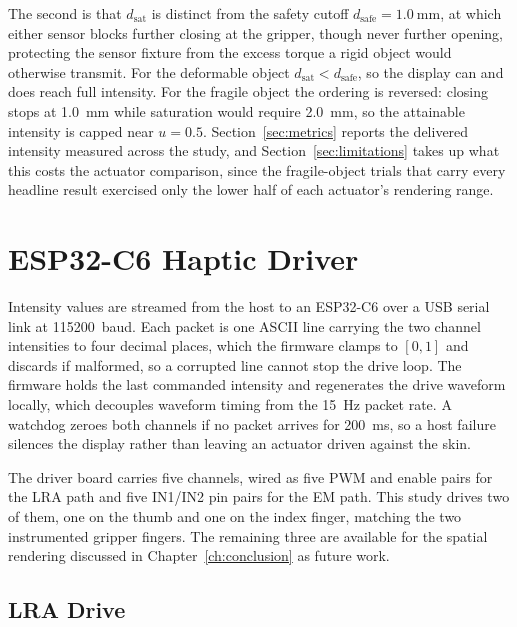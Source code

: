\documentclass[12pt, a4paper, twoside, openright]{report}
\begin{document}
The second is that $d_{\text{sat}}$ is distinct from the safety cutoff
$d_{\text{safe}} = \SI{1.0}{\milli\metre}$, at which either sensor blocks
further closing at the gripper, though never further opening, protecting the
sensor fixture from the excess torque a rigid object would otherwise transmit.
For the deformable object $d_{\text{sat}} < d_{\text{safe}}$, so the display
can and does reach full intensity. For the fragile object the ordering is
reversed: closing stops at \SI{1.0}{\milli\metre} while saturation would
require \SI{2.0}{\milli\metre}, so the attainable intensity is capped near
$u = 0.5$. Section~\ref{sec:metrics} reports the delivered intensity measured
across the study, and Section~\ref{sec:limitations} takes up what this costs
the actuator comparison, since the fragile-object trials that carry every
headline result exercised only the lower half of each actuator's rendering
range.

\section{ESP32-C6 Haptic Driver}
\label{sec:driver}

Intensity values are streamed from the host to an ESP32-C6 over a USB serial
link at \SI{115200}{baud}. Each packet is one ASCII line carrying the two
channel intensities to four decimal places, which the firmware clamps to
$[0,1]$ and discards if malformed, so a corrupted line cannot stop the drive
loop. The firmware holds the last commanded intensity and regenerates the drive
waveform locally, which decouples waveform timing from the
\SI{15}{\hertz} packet rate. A watchdog zeroes both channels if no packet
arrives for \SI{200}{\milli\second}, so a host failure silences the display
rather than leaving an actuator driven against the skin.

The driver board carries five channels, wired as five PWM and enable pairs for
the LRA path and five IN1/IN2 pin pairs for the EM path. This study drives two
of them, one on the thumb and one on the index finger, matching the two
instrumented gripper fingers. The remaining three are available for the spatial
rendering discussed in Chapter~\ref{ch:conclusion} as future work.

\subsection{LRA Drive}
\label{subsec:lra-drive}
\end{document}
